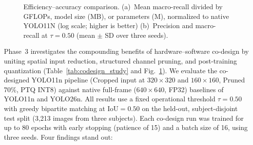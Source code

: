 \documentclass[conference]{IEEEtran}
\begin{document}
\begin{figure}[!t]
\caption{Efficiency--accuracy comparison. (a)~Mean macro-recall divided by GFLOPs, model size (MB), or parameters (M), normalized to native YOLO11N (log scale; higher is better) (b)~Precision and macro-recall at $\tau=0.50$ (mean $\pm$ SD over three seeds).}
\label{fig:efficiency_accuracy}
\end{figure}
Phase~3 investigates the compounding benefits of hardware--software co-design by uniting spatial input reduction, structured channel pruning, and post-training quantization (Table~\ref{tab:codesign_study} and Fig.~\ref{fig:efficiency_accuracy}). We evaluate the co-designed YOLO11n pipeline (Cropped input at $320\times 320$ and $160 \times 160$, Pruned 70\%, PTQ INT8) against native full-frame ($640\times 640$, FP32) baselines of YOLO11n and YOLO26n. All results use a fixed operational threshold $\tau = 0.50$ with greedy bipartite matching at $\text{IoU} = 0.50$ on the held-out, subject-disjoint test split (3{,}213 images from three subjects). Each co-design run was trained for up to 80 epochs with early stopping (patience of 15) and a batch size of 16, using three seeds. Four findings stand out:
\end{document}
